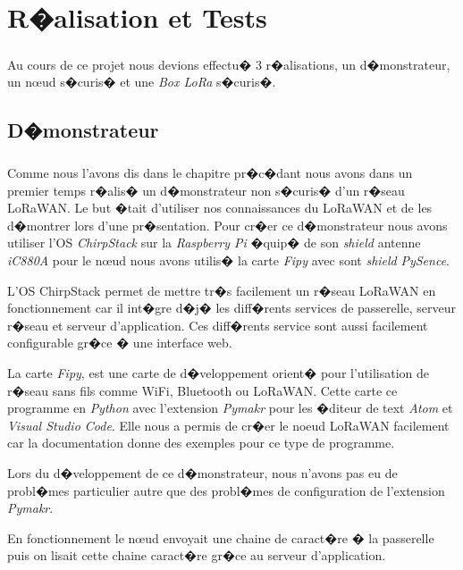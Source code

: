 \documentclass[a4paper, titlepage,12pt]{report}
\begin{document}
\chapter{R�alisation et Tests}
\paragraph{}  

Au cours de ce projet nous devions effectu� 3 r�alisations, un d�monstrateur, un n\oe{}ud s�curis� et une \textit{Box LoRa} s�curis�.



\section{D�monstrateur}
\paragraph{}
Comme nous l'avons dis dans le chapitre pr�c�dant nous avons dans un premier temps r�alis� un d�monstrateur non s�curis� d'un r�seau LoRaWAN. Le but �tait d'utiliser nos connaissances du LoRaWAN et de les d�montrer lors d'une pr�sentation. Pour cr�er ce d�monstrateur nous avons utiliser l'OS \textit{ChirpStack}\cite{chirpstarksite} sur la \textit{Raspberry Pi} �quip� de son \textit{shield} antenne \textit{iC880A} pour le n\oe{}ud nous avons utilis� la carte \textit{Fipy}\cite{fipysite} avec sont \textit{shield} \textit{PySence}.

L'OS ChirpStack permet de mettre tr�s facilement un r�seau LoRaWAN en fonctionnement car il int�gre d�j� les diff�rents services de passerelle, serveur r�seau et serveur d'application. Ces diff�rents service sont aussi facilement configurable gr�ce � une interface web.

La carte \textit{Fipy}, est une carte de d�veloppement orient� pour l'utilisation de r�seau sans fils comme WiFi, Bluetooth ou LoRaWAN. Cette carte ce programme en \textit{Python} avec l'extension \textit{Pymakr} pour les �diteur de text \textit{Atom} et \textit{Visual Studio Code}.
Elle nous a permis de cr�er le noeud LoRaWAN facilement car la documentation donne des exemples pour ce type de programme.

Lors du d�veloppement de ce d�monstrateur, nous n'avons pas eu de probl�mes particulier autre que des probl�mes de configuration de l'extension \textit{Pymakr}.

En fonctionnement le n\oe{}ud envoyait une chaine de caract�re � la passerelle puis on lisait cette chaine caract�re gr�ce au serveur d'application. 
\end{document}
